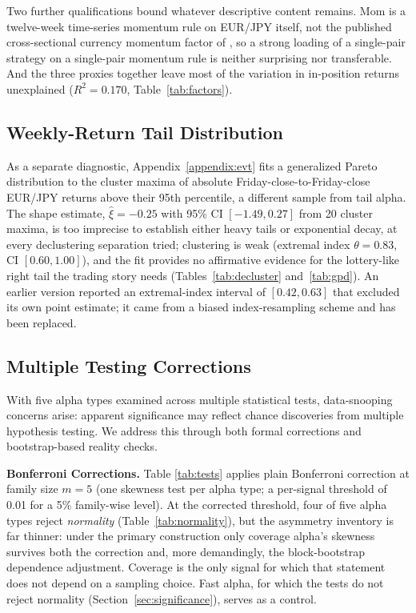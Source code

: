 \documentclass[11pt]{article}
\begin{document}
Two further qualifications bound whatever descriptive content remains. Mom is a twelve-week time-series momentum rule on EUR/JPY itself, not the published cross-sectional currency momentum factor of \citet{menkhoff2012currency}, so a strong loading of a single-pair strategy on a single-pair momentum rule is neither surprising nor transferable. And the three proxies together leave most of the variation in in-position returns unexplained ($R^2 = 0.170$, Table~\ref{tab:factors}).

\subsection{Weekly-Return Tail Distribution}
\label{sec:evt}

As a separate diagnostic, Appendix~\ref{appendix:evt} fits a generalized Pareto distribution to the cluster maxima of absolute Friday-close-to-Friday-close EUR/JPY returns above their 95th percentile, a different sample from tail alpha. The shape estimate, $\hat{\xi} = -0.25$ with 95\% CI $[-1.49, 0.27]$ from 20 cluster maxima, is too imprecise to establish either heavy tails or exponential decay, at every declustering separation tried; clustering is weak (extremal index $\theta = 0.83$, CI $[0.60, 1.00]$), and the fit provides no affirmative evidence for the lottery-like right tail the trading story needs (Tables~\ref{tab:decluster} and~\ref{tab:gpd}). An earlier version reported an extremal-index interval of $[0.42, 0.63]$ that excluded its own point estimate; it came from a biased index-resampling scheme and has been replaced.

\subsection{Multiple Testing Corrections}
\label{sec:snooping}

With five alpha types examined across multiple statistical tests, data-snooping concerns arise: apparent significance may reflect chance discoveries from multiple hypothesis testing. We address this through both formal corrections and bootstrap-based reality checks.

\textbf{Bonferroni Corrections.} Table \ref{tab:tests} applies plain Bonferroni correction at family size $m = 5$ (one skewness test per alpha type; a per-signal threshold of 0.01 for a 5\% family-wise level). At the corrected threshold, four of five alpha types reject \emph{normality} (Table~\ref{tab:normality}), but the asymmetry inventory is far thinner: under the primary construction only coverage alpha's skewness survives both the correction and, more demandingly, the block-bootstrap dependence adjustment. Coverage is the only signal for which that statement does not depend on a sampling choice. Fast alpha, for which the tests do not reject normality (Section~\ref{sec:significance}), serves as a control.
\end{document}
